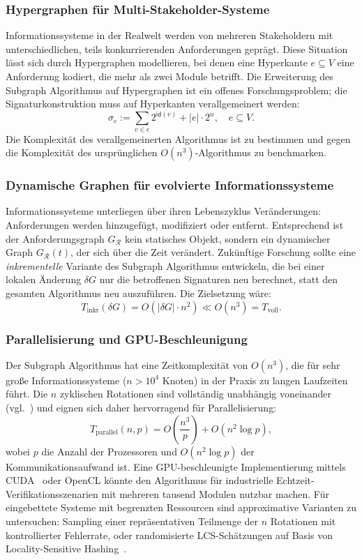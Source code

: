 ﻿\documentclass[a4paper,12pt]{article}
\theoremstyle{definition}
\begin{document}
\subsubsection{Hypergraphen für Multi-Stakeholder-Systeme}

Informationssysteme in der Realwelt werden von mehreren Stakeholdern mit
unterschiedlichen, teils konkurrierenden Anforderungen geprägt. Diese Situation
lässt sich durch Hypergraphen modellieren, bei denen eine Hyperkante
$e \subseteq V$ eine Anforderung kodiert, die mehr als zwei Module betrifft.
Die Erweiterung des Subgraph Algorithmus auf Hypergraphen ist ein offenes
Forschungsproblem; die Signaturkonstruktion muss auf Hyperkanten verallgemeinert
werden:
\[
  \sigma_e := \sum_{v \in e} 2^{\mathsf{id}(v)} + |e| \cdot 2^n, \quad e \subseteq V.
\]
Die Komplexität des verallgemeinerten Algorithmus ist zu bestimmen und gegen die
Komplexität des ursprünglichen $O(n^3)$-Algorithmus zu benchmarken.

\subsubsection{Dynamische Graphen für evolvierte Informationssysteme}

Informationssysteme unterliegen über ihren Lebenszyklus Veränderungen: Anforderungen
werden hinzugefügt, modifiziert oder entfernt. Entsprechend ist der Anforderungsgraph
$G_\mathcal{R}$ kein statisches Objekt, sondern ein dynamischer Graph
$G_\mathcal{R}(t)$, der sich über die Zeit verändert. Zukünftige Forschung sollte
eine \emph{inkrementelle} Variante des Subgraph Algorithmus entwickeln, die bei einer
lokalen Änderung $\delta G$ nur die betroffenen Signaturen neu berechnet, statt den
gesamten Algorithmus neu auszuführen. Die Zielsetzung wäre:
\[
  T_{\text{inkr}}(\delta G) = O(|\delta G| \cdot n^2) \ll O(n^3) = T_{\text{voll}}.
\]

\subsubsection{Parallelisierung und GPU-Beschleunigung}

Der Subgraph Algorithmus hat eine Zeitkomplexität von $O(n^3)$, die für sehr große
Informationssysteme ($n > 10^4$ Knoten) in der Praxis zu langen Laufzeiten führt.
Die $n$ zyklischen Rotationen sind vollständig unabhängig voneinander
(vgl.~\cite{subgraph2026}) und eignen sich daher hervorragend für Parallelisierung:
\[
  T_{\text{parallel}}(n, p) = O\!\left(\frac{n^3}{p}\right) + O(n^2 \log p),
\]
wobei $p$ die Anzahl der Prozessoren und $O(n^2 \log p)$ der Kommunikationsaufwand ist.
Eine GPU-beschleunigte Implementierung mittels CUDA~\cite{cuda2023} oder OpenCL könnte
den Algorithmus für industrielle Echtzeit-Verifikationsszenarien mit mehreren tausend
Modulen nutzbar machen. Für eingebettete Systeme mit begrenzten Ressourcen sind
approximative Varianten zu untersuchen: Sampling einer repräsentativen Teilmenge der
$n$ Rotationen mit kontrollierter Fehlerrate, oder randomisierte LCS-Schätzungen
auf Basis von Locality-Sensitive Hashing~\cite{indyk1998}.
\end{document}

